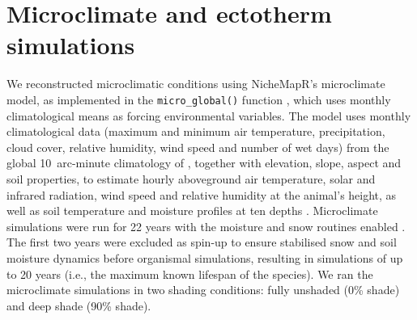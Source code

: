 \documentclass[12pt]{article}
\begin{document}
\section{Microclimate and ectotherm simulations}\label{sm:simulations}

We reconstructed microclimatic conditions using NicheMapR's microclimate model, as implemented in the \texttt{micro\_global()} function \parencite{kearney2017a,kearney2014}, which uses monthly climatological means as forcing environmental variables. The model uses monthly climatological data (maximum and minimum air temperature, precipitation, cloud cover, relative humidity, wind speed and number of wet days) from the global 10~arc-minute climatology of \textcite{new2002}, together with elevation, slope, aspect and soil properties, to estimate hourly aboveground air temperature, solar and infrared radiation, wind speed and relative humidity at the animal's height, as well as soil temperature and moisture profiles at ten depths \parencite{kearney2014,kearney2017a}. Microclimate simulations were run for 22 years with the moisture and snow routines enabled \parencite{kearney2018a,kearney2020b}. The first two years were excluded as spin-up to ensure stabilised snow and soil moisture dynamics before organismal simulations, resulting in simulations of up to 20 years (i.e., the maximum known lifespan of the species). We ran the microclimate simulations in two shading conditions: fully unshaded (0\% shade) and deep shade (90\% shade).
\end{document}
